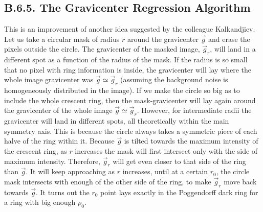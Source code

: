 \documentclass[11pt, a4paper, twoside]{article} %
\begin{document}



\subsection*{B.6.5. The Gravicenter Regression Algorithm}
This is an improvement of another idea suggested by the colleague Kalkandjiev. Let us take a circular mask of radius $r$ around the gravicenter $\vec{g}$ and erase the pixels outside the circle. The gravicenter of the masked image, $\vec{g}_r$, will land in a different spot as a function of the radius of the mask. If the radius is so small that no pixel with ring information is inside, the gravicenter will lay where the whole image gravicenter was $\vec{g}\simeq\vec{g}_r$ (assuming the background noise is homogeneously distributed in the image). If we make the circle so big as to include the whole crescent ring, then the mask-gravicenter will lay again around the gravicenter of the whole image $\vec{g}\simeq\vec{g}_r$. However, for intermediate radii the gravicenter will land in different spots, all theoretically within the main symmetry axis. This is because the circle always takes a symmetric piece of each halve of the ring within it. Because $\vec{g}$ is tilted towards the maximum intensity of the crescent ring, as $r$ increases the mask will first intersect only with the side of maximum intensity. Therefore, $\vec{g}_r$ will get even closer to that side of the ring than $\vec{g}$. It will keep approaching as $r$ increases, until at a certain $r_0$, the circle mask intersects with enough of the other side of the ring, to make $\vec{g}_r$ move back towards $\vec{g}$. It turns out the $r_0$ point lays exactly in the Poggendorff dark ring for a ring with big enough $\rho_0$. 
\end{document}
